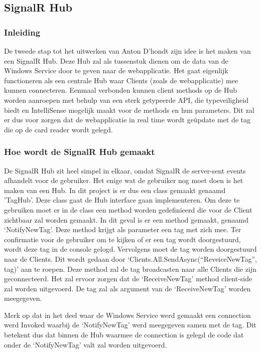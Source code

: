 \subsection{SignalR Hub}

\subsubsection{Inleiding}
De tweede stap tot het uitwerken van Anton D'hondt zijn idee is het maken van een SignalR Hub. Deze Hub zal als tussenstuk dienen om de data van de Windows Service door te geven naar de webapplicatie. Het gaat eigenlijk functioneren als een centrale Hub waar Clients (zoals de webapplicatie) mee kunnen connecteren. Eenmaal verbonden kunnen client methods op de Hub worden aanroepen met behulp van een sterk getypeerde API, die typeveiligheid biedt en IntelliSense mogelijk maakt voor de methods en hun parameters. Dit zal er dus voor zorgen dat de webapplicatie in real time wordt geüpdate met de tag die op de card reader wordt gelegd. 

\subsubsection{Hoe wordt de SignalR Hub gemaakt}
De SignalR Hub zit heel simpel in elkaar, omdat SignalR de server-sent events afhandelt voor de gebruiker. Het enige wat de gebruiker nog moet doen is het maken van een Hub. In dit project is er dus een class gemaakt genaamd 'TagHub’. Deze class gaat de Hub interface gaan implementeren. Om deze te gebruiken moet er in de class een method worden gedefinieerd die voor de Client zichtbaar zal worden gemaakt. In dit geval is er een method gemaakt, genaamd ‘NotifyNewTag’. Deze method krijgt als parameter een tag met zich mee. Ter confirmatie voor de gebruiker om te kijken of er een tag wordt doorgestuurd, wordt deze tag in de console gelogd. Vervolgens moet de tag worden doorgestuurd naar de Clients. Dit wordt gedaan door ‘Clients.All.SendAsync(“ReveiceNewTag”, tag)’ aan te roepen. Deze method zal de tag broadcasten naar alle Clients die zijn geconnecteerd. Het zal ervoor zorgen dat de ‘ReceiveNewTag’ method client-side zal worden uitgevoerd. De tag zal als argument van de ‘ReceiveNewTag’ worden meegegeven. 

Merk op dat in het deel waar de Windows Service werd gemaakt een connection werd Invoked waarbij de ‘NotifyNewTag’ werd meegegeven samen met de tag. Dit betekent dus dat binnen de Hub waarmee de connection is gelegd de code dat onder de ‘NotifyNewTag’ valt zal worden uitgevoerd.

